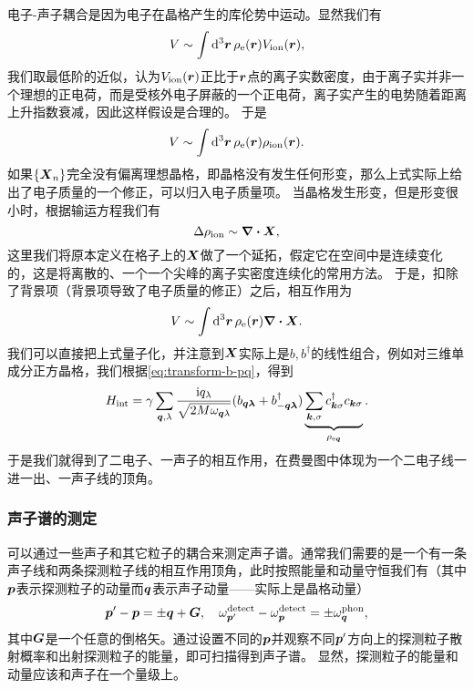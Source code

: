 \documentclass[hyperref, UTF8, a4paper]{ctexart}
\newcommand*{\ii}{\mathrm{i}}
\begin{document}
电子-声子耦合是因为电子在晶格产生的库伦势中运动。显然我们有
\[
    V \sim \int \dd[3]{\vb*{r}} \rho_\text{e}(\vb*{r}) V_\text{ion}(\vb*{r}),
\]
我们取最低阶的近似，认为$V_\text{ion}(\vb*{r})$正比于$\vb*{r}$点的离子实数密度，由于离子实并非一个理想的正电荷，而是受核外电子屏蔽的一个正电荷，离子实产生的电势随着距离上升指数衰减，因此这样假设是合理的。
于是
\[
    V \sim \int \dd[3]{\vb*{r}} \rho_\text{e}(\vb*{r}) \rho_\text{ion}(\vb*{r}).
\]
如果$\{\vb*{X}_n\}$完全没有偏离理想晶格，即晶格没有发生任何形变，那么上式实际上给出了电子质量的一个修正，可以归入电子质量项。
当晶格发生形变，但是形变很小时，根据输运方程我们有
\[
    \Delta \rho_\text{ion} \sim \div{\vb*{X}},
\]
这里我们将原本定义在格子上的$\vb*{X}$做了一个延拓，假定它在空间中是连续变化的，这是将离散的、一个一个尖峰的离子实密度连续化的常用方法。
于是，扣除了背景项（背景项导致了电子质量的修正）之后，相互作用为
\[
    V \sim \int \dd[3]{\vb*{r}} \rho_\text{e}(\vb*{r}) \div{\vb*{X}}.
\]
我们可以直接把上式量子化，并注意到${\vb*{X}}$实际上是${b}, {b}^\dagger$的线性组合，例如对三维单成分正方晶格，我们根据\eqref{eq:transform-b-pq}，得到
\begin{equation}
    {H}_\text{int} = \gamma \sum_{\vb*{q}, \lambda} \frac{\ii q_\lambda}{\sqrt{2 M \omega_{\vb*{q} \lambda}}} ({b}_{\vb*{q} \vb*{\lambda}} + {b}^\dagger_{-\vb*{q} \vb*{\lambda}}) \underbrace{\sum_{\vb*{k}, \sigma} {c}^\dagger_{\vb*{k} \sigma} {c}_{\vb*{k} \sigma}}_{{\rho}_{\text{e} \vb*{q}}}.
    \label{eq:simple-phonon-electron-int}
\end{equation}
于是我们就得到了二电子、一声子的相互作用，在费曼图中体现为一个二电子线一进一出、一声子线的顶角。

\subsubsection{声子谱的测定}

可以通过一些声子和其它粒子的耦合来测定声子谱。通常我们需要的是一个有一条声子线和两条探测粒子线的相互作用顶角，此时按照能量和动量守恒我们有（其中$\vb*{p}$表示探测粒子的动量而$\vb*{q}$表示声子动量——实际上是晶格动量）
\begin{equation}
    \vb*{p}' - \vb*{p} = \pm \vb*{q} + \vb*{G}, \quad \omega^\text{detect}_{\vb*{p}'} - \omega^\text{detect}_{\vb*{p}} = \pm \omega^\text{phon}_{\vb*{q}},
\end{equation}
其中$\vb*{G}$是一个任意的倒格矢。通过设置不同的$\vb*{p}$并观察不同$\vb*{p}'$方向上的探测粒子散射概率和出射探测粒子的能量，即可扫描得到声子谱。
显然，探测粒子的能量和动量应该和声子在一个量级上。
\end{document}
